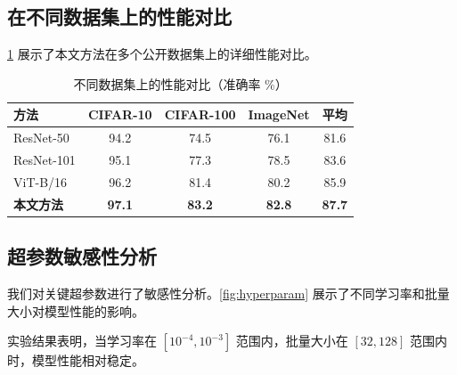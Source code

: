 \documentclass[macnew, cn]{manuscript}
\begin{document}
\subsection{在不同数据集上的性能对比}

\cref{tab:appendix-results} 展示了本文方法在多个公开数据集上的详细性能对比。

\begin{table}[h]
    \centering
    \caption{不同数据集上的性能对比（准确率 \%）}
    \label{tab:appendix-results}
    \begin{tabular}{lcccc}
        \toprule
        方法 & CIFAR-10 & CIFAR-100 & ImageNet & 平均 \\
        \midrule
        ResNet-50 & 94.2 & 74.5 & 76.1 & 81.6 \\
        ResNet-101 & 95.1 & 77.3 & 78.5 & 83.6 \\
        ViT-B/16 & 96.2 & 81.4 & 80.2 & 85.9 \\
        \textbf{本文方法} & \textbf{97.1} & \textbf{83.2} & \textbf{82.8} & \textbf{87.7} \\
        \bottomrule
    \end{tabular}
\end{table}

\subsection{超参数敏感性分析}

我们对关键超参数进行了敏感性分析。\cref{fig:hyperparam} 展示了不同学习率和批量大小对模型性能的影响。


实验结果表明，当学习率在 $[10^{-4}, 10^{-3}]$ 范围内，批量大小在 $[32, 128]$ 范围内时，模型性能相对稳定。

\printbibliography
\end{document}

